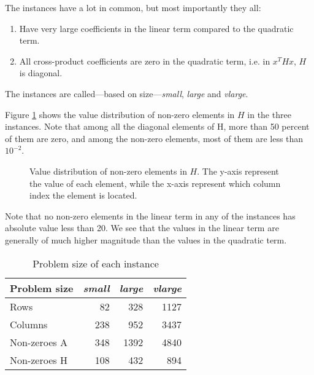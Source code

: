 The instances have a lot in common, but most importantly they all:
\begin{enumerate}
\item Have very large coefficients in the linear term compared to the
quadratic term.
\item All cross-product coefficients are zero in the quadratic term, i.e. in
$x^T H x$, $H$ is diagonal.
\end{enumerate}

The instances are called---based on size---\textit{small}, \textit{large}
and \textit{vlarge}.

Figure \ref{fig:histH} shows the value distribution of non-zero elements in $H$
in the three instances. Note that among all the diagonal elements of H, more
than 50 percent of them are zero, and among the non-zero elements, most of them
are less than $10^{-2}$.
\begin{figure}[h!]
\begin{center}

\end{center}
\caption{Value distribution of non-zero elements in $H$. The y-axis represent
the value of each element, while the x-axis represent which column index the
element is located.}
\label{fig:histH}
\end{figure}
Note that no non-zero elements in the linear term in any of the instances
has absolute value less than 20. We see that the values in the linear term
are generally of much higher magnitude than the values in the quadratic term.

\begin{table}[h!]
    \centering
    \caption{Problem size of each instance}
    \begin{tabular}{lrrr}
    Problem size & \textit{small} & \textit{large} & \textit{vlarge} \\\hline
    Rows         & 82             & 328            & 1127 \\
    Columns      & 238            & 952            & 3437 \\
    Non-zeroes A & 348            & 1392           & 4840 \\
    Non-zeroes H & 108            & 432            & 894 \\
    \end{tabular}
    \label{table:sizes}
\end{table}

